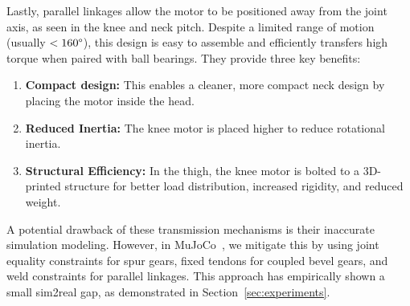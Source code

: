 



Lastly, parallel linkages allow the motor to be positioned away from the joint axis, as seen in the knee and neck pitch. Despite a limited range of motion (usually $<160\degree$), this design is easy to assemble and efficiently transfers high torque when paired with ball bearings. They provide three key benefits:
\begin{enumerate}
    \item \textbf{Compact design:} This enables a cleaner, more compact neck design by placing the motor inside the head.
    \item \textbf{Reduced Inertia:} The knee motor is placed higher to reduce rotational inertia.
    \item \textbf{Structural Efficiency:}
    In the thigh, the knee motor is bolted to a 3D-printed structure for better load distribution, increased rigidity, and reduced weight.
\end{enumerate}

A potential drawback of these transmission mechanisms is their inaccurate simulation modeling. However, in MuJoCo~\citep{todorov2012mujoco}, we mitigate this by using joint equality constraints for spur gears, fixed tendons for coupled bevel gears, and weld constraints for parallel linkages. This approach has empirically shown a small sim2real gap, as demonstrated in Section~\ref{sec:experiments}.

